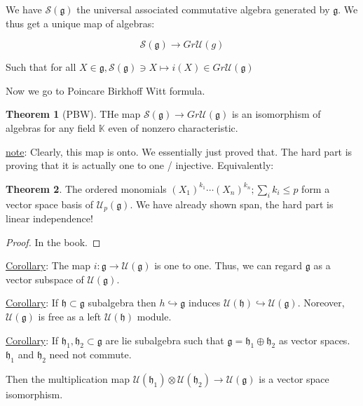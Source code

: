 \documentclass{article}
\theoremstyle{definition}
\newtheorem{theorem}{Theorem}
\begin{document}
We have \(\mathcal{S}(\mathfrak{g})\) the universal associated commutative algebra generated by \(\mathfrak{g}\). We thus get a unique map of algebras:

\[
    \mathcal{S}(\mathfrak{g}) \to Gr \mathcal{U}(g)
\]

Such that for all \(X\in \mathfrak{g}, \mathcal{S}(\mathfrak{g})\ni X \mapsto i(X) \in Gr \mathcal{U}(\mathfrak{g})\) 

Now we go to Poincare Birkhoff Witt formula.

\begin{theorem}
    [PBW] THe map \(\mathcal{S}(\mathfrak{g}) \to Gr \mathcal{U} (\mathfrak{g})\) is an isomorphism of algebras for any field \(\mathbb{K} \)  even of nonzero characteristic.
\end{theorem}

\underline{note}: Clearly, this map is onto. We essentially just proved that. The hard part is proving that it is actually one to one / injective. Equivalently:

\begin{theorem}
    The ordered monomials \((X_1)^{k_1}\cdots (X_n)^{k_n}; \sum_{i} k_i \leq p\) form a vector space basis of \(\mathcal{U}_p(\mathfrak{g})\). We have already shown span, the hard part is linear independence!
\end{theorem}

\begin{proof}
    In the book.
\end{proof}

\underline{Corollary}: The map \(i:\mathfrak{g} \to \mathcal{U} (\mathfrak{g}) \) is one to one. Thus, we can regard \(\mathfrak{g}\) as a vector subspace of \(\mathcal{U} (\mathfrak{g})\).  

\underline{Corollary}: If \(\mathfrak{h} \subset \mathfrak{g} \) subalgebra then \(h\hookrightarrow \mathfrak{g}\) induces \(\mathcal{U}(\mathfrak{h}) \hookrightarrow \mathcal{U} (\mathfrak{g})\). Noreover, \(\mathcal{U} (\mathfrak{g})\) is free as a left \(\mathcal{U} (\mathfrak{h})\) module.

\underline{Corollary}: If \(\mathfrak{h} _1, \mathfrak{h} _2 \subset \mathfrak{g}\) are lie subalgebra such that \(\mathfrak{g} = \mathfrak{h} _1 \oplus \mathfrak{h} _2\) as vector spaces. \(\mathfrak{h}_1\) and \(\mathfrak{h}_2\) need not commute.

Then the multiplication map \(\mathcal{U}(\mathfrak{h}_1) \otimes \mathcal{U}(\mathfrak{h}_2) \to \mathcal{U}(\mathfrak{g})\) is a vector space isomorphism.
\end{document}
